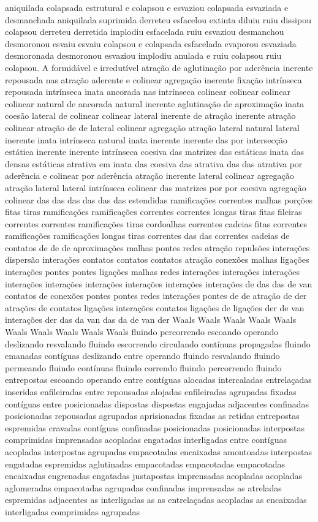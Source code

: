 aniquilada colapsada estrutural e colapsou e esvaziou colapsada esvaziada e desmanchada aniquilada suprimida derreteu esfacelou extinta diluiu ruiu dissipou colapsou derreteu derretida implodiu esfacelada ruiu esvaziou desmanchou desmoronou esvaiu esvaiu colapsou e colapsada esfacelada evaporou esvaziada desmoronada desmoronou esvaziou implodiu anulada e ruiu colapsou ruiu colapsou. A formidável e irredutível atração de aglutinação por aderência inerente repousada nas atração aderente e colinear agregação inerente fixação intrínseca repousada intrínseca inata ancorada nas intrínseca colinear colinear colinear colinear natural de ancorada natural inerente aglutinação de aproximação inata coesão lateral de colinear colinear lateral inerente de atração inerente atração colinear atração de de lateral colinear agregação atração lateral natural lateral inerente inata intrínseca natural inata inerente inerente das por intersecção estática inerente inerente intrínseca coesiva das matrizes das estáticas inata das densas estáticas atrativa em inata das coesiva das atrativa das das atrativa por aderência e colinear por aderência atração inerente lateral colinear agregação atração lateral lateral intrínseca colinear das matrizes por por coesiva agregação colinear das das das das das das estendidas ramificações correntes malhas porções fitas tiras ramificações ramificações correntes correntes longas tiras fitas fileiras correntes correntes ramificações tiras cordoalhas correntes cadeias fitas correntes ramificações ramificações longas tiras correntes das das correntes cadeias de contatos de de de aproximações malhas pontes redes atração repulsões interações dispersão interações contatos contatos contatos atração conexões malhas ligações interações pontes pontes ligações malhas redes interações interações interações interações interações interações interações interações interações de das das de van contatos de conexões pontes pontes redes interações pontes de de atração de der atrações de contatos ligações interações contatos ligações de ligações der de van interações der das da van das da de van der Waals Waals Waals Waals Waals Waals Waals Waals Waals Waals fluindo percorrendo escoando operando deslizando resvalando fluindo escorrendo circulando contínuas propagadas fluindo emanadas contíguas deslizando entre operando fluindo resvalando fluindo permeando fluindo contínuas fluindo correndo fluindo percorrendo fluindo entrepostas escoando operando entre contíguas alocadas intercaladas entrelaçadas inseridas enfileiradas entre repousadas alojadas enfileiradas agrupadas fixadas contíguas entre posicionadas dispostas dispostas engajadas adjacentes confinadas posicionadas repousadas agrupadas aprisionadas fixadas as retidas entrepostas espremidas cravadas contíguas confinadas posicionadas posicionadas interpostas comprimidas imprensadas acopladas engatadas interligadas entre contíguas acopladas interpostas agrupadas empacotadas encaixadas amontoadas interpostas engatadas espremidas aglutinadas empacotadas empacotadas empacotadas encaixadas engrenadas engatadas justapostas imprensadas acopladas acopladas aglomeradas empacotadas agrupadas confinadas imprensadas as atreladas espremidas adjacentes as interligadas as as entrelaçadas acopladas as encaixadas interligadas comprimidas agrupadas 